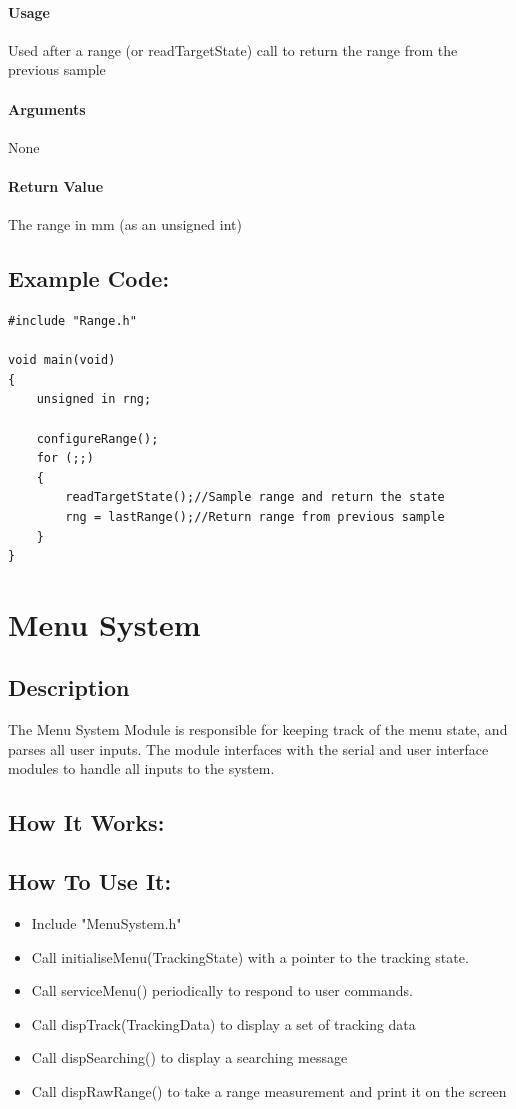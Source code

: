 \documentclass[]{report}
\begin{document}
\subsubsection{Usage}
Used after a range (or readTargetState) call to return the range from the previous sample

\subsubsection{Arguments}
None

\subsubsection{Return Value}
The range in mm (as an unsigned int)

\section{Example Code:}
\begin{lstlisting}
#include "Range.h"

void main(void)
{
	unsigned in rng;
	
	configureRange();
	for (;;) 
	{
		readTargetState();//Sample range and return the state
		rng = lastRange();//Return range from previous sample
	}
}
\end{lstlisting}

\chapter{Menu System}
\section{Description}
The Menu System Module is responsible for keeping track of the menu state, and parses all user inputs. The module interfaces with the serial and user interface modules to handle all inputs to the system.

\section{How It Works:}

\section{How To Use It:}
\begin{itemize}
	\item Include "MenuSystem.h"
	\item Call initialiseMenu(TrackingState) with a pointer to the tracking state. 
	\item Call serviceMenu() periodically to respond to user commands.
	\item Call dispTrack(TrackingData) to display a set of tracking data
	\item Call dispSearching() to display a searching message
	\item Call dispRawRange() to take a range measurement and print it on the screen
\end{itemize}
\end{document}

